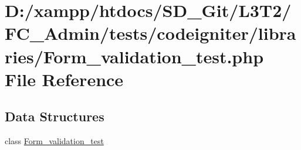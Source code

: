 \hypertarget{_form__validation__test_8php}{}\section{D\+:/xampp/htdocs/\+S\+D\+\_\+\+Git/\+L3\+T2/\+F\+C\+\_\+\+Admin/tests/codeigniter/libraries/\+Form\+\_\+validation\+\_\+test.php File Reference}
\label{_form__validation__test_8php}
\subsection*{Data Structures}
\begin{DoxyCompactItemize}
\item 
class \hyperlink{class_form__validation__test}{Form\+\_\+validation\+\_\+test}
\end{DoxyCompactItemize}
